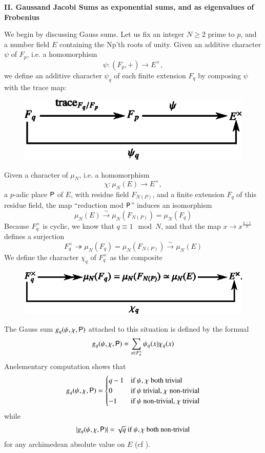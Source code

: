 \bigskip
\noindent
{\bf II. Gauss\pageoriginale and Jacobi Sums as exponential sums, and as eigenvalues of Frobenius}
\smallskip

We begin by discussing Gauss sums. Let us fix an integer $N\geq 2$ prime to $p$, and a number field $E$ containing the Np'th roots of unity. Given an additive character $\psi$ of $F_{p}$, i.e. a homomorphism
$$
\psi : (F_{p},+)\to E^{\times},
$$
we define an additive character $\psi_{q}$ of each finite extension $F_{q}$ by composing $\psi$ with the trace map:
\begin{figure}[H]
\centering
\includegraphics{chap6/fig1.eps}
\end{figure}
Given a character of $\mu_{N}$, i.e. a homomorphism
$$
\chi : \mu_{N}(E)\to E^{\times},
$$
a $p$-adic place $\mathsf{P}$ of $E$, with residue field $F_{N(P)}$, and a finite extension $F_{q}$ of this residue field, the map ``reduction mod $\mathsf{P}$'' induces an isomorphism
$$
\mu_{N}(E)\xrightarrow{\sim}\mu_{N}(F_{N(P)})=\mu_{N}(F_{q})
$$
Because $F^{\times}_{q}$ is cyclic, we know that $q\equiv 1\mod N$, and that the map $x\to x^{\frac{q-1}{N}}$ defines a surjection
$$
F^{\times}_{q}\twoheadrightarrow \mu_{N}(F_{q})=\mu_{N}(F_{N(P)})\xrightarrow{\sim}\mu_{N}(E)
$$
We define the character $\chi_{q}$ of $F^{\times}_{q}$ as the composite
\begin{figure}[H]
\centering
\includegraphics{chap6/fig2.eps}
\end{figure}
The Gauss sum $g_{q}(\psi,\chi,\mathsf{P})$ attached to this situation is defined by the formual
$$
g_{q}(\psi,\chi,\mathsf{P})=\sum\limits_{x\in F^{\times}_{q}}\psi_{q}(x)\chi_{q}(x)
$$
An\pageoriginale elementary computation shows that
$$
g_{q}(\psi,\chi,\mathsf{P})=
\begin{cases}
q-1 & \text{if $\psi$, $\chi$ both trivial}\\
0   & \text{if $\psi$ trivial, $\chi$ non-trivial}\\
-1  & \text{if $\psi$ non-trivial, $\chi$ trivial}
\end{cases}
$$
while
$$
|g_{q}(\psi,\chi,\mathsf{P})|=\sqrt{q}\text{~~ if~~ } \psi,\chi\text{~ both non-trivial}
$$
for any archimedean absolute value on $E$ (cf \cite{art6-key47}).


